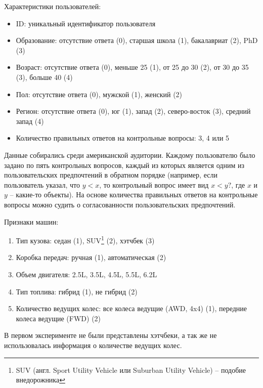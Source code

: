 		\vspace{1em}
		
		\noindent Характеристики пользователей:
		\vspace{-0.7em}
		\begin{itemize}[itemsep=-1.5mm]
			\item ID: уникальный идентификатор пользователя
			\item Образование: отсутствие ответа (0), старшая школа (1), бакалавриат (2), PhD (3)
			\item Возраст: отсутствие ответа (0), меньше 25 (1), от 25 до 30 (2), от 30 до 35 (3), больше 40 (4)
			\item Пол: отсутствие ответа (0), мужской (1), женский (2)
			\item Регион: отсутствие ответа (0), юг (1), запад (2), северо-восток (3), средний запад (4)
			\item Количество правильных ответов на контрольные вопросы: 3, 4 или 5
		\end{itemize}
		Данные собирались среди американской аудитории. Каждому пользователю было задано по пять контрольных вопросов, каждый из которых является одним из пользовательских предпочтений в обратном порядке (например, если пользователь указал, что $y < x$, то контрольный вопрос имеет вид $x < y?$, где $x$ и $y$ – какие-то объекты). На основе количества правильных ответов на контрольные вопросы можно судить о согласованности пользовательских предпочтений.
		
		\vspace{1em}
		
		\noindent Признаки машин:
		\vspace{-0.7em}
		\begin{enumerate}[itemsep=-1.5mm]
			\item Тип кузова: седан (1), SUV\footnote{SUV (англ. Sport Utility Vehicle или Suburban Utility Vehicle) – подобие внедорожника} (2), хэтчбек (3)
			\item Коробка передач: ручная (1), автоматическая (2)
			\item Объем двигателя: 2.5L, 3.5L, 4.5L, 5.5L, 6.2L
			\item Тип топлива: гибрид (1), не гибрид (2)
			\item Количество ведущих колес: все колеса ведущие (AWD, 4x4) (1), передние колеса ведущие (FWD) (2)
		\end{enumerate} 
		В первом эксперименте не были представлены хэтчбеки, а так же не использовалась информация о количестве ведущих колес.
	
